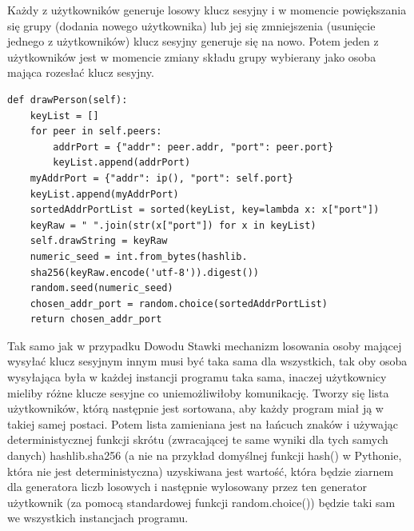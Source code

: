 Każdy z użytkowników generuje losowy klucz sesyjny i w momencie powiększania się grupy (dodania nowego użytkownika) lub jej się zmniejszenia (usunięcie jednego z użytkowników) klucz sesyjny generuje się na nowo. Potem jeden z użytkowników jest w momencie zmiany składu grupy wybierany jako osoba mająca rozesłać klucz sesyjny.


\begin{lstlisting}[caption={Wybieranie osoby mającej rozesłać klucz sesyjny}]
def drawPerson(self):
    keyList = []
    for peer in self.peers:
        addrPort = {"addr": peer.addr, "port": peer.port}
        keyList.append(addrPort)
    myAddrPort = {"addr": ip(), "port": self.port}
    keyList.append(myAddrPort)
    sortedAddrPortList = sorted(keyList, key=lambda x: x["port"])
    keyRaw = " ".join(str(x["port"]) for x in keyList)
    self.drawString = keyRaw
    numeric_seed = int.from_bytes(hashlib.
    sha256(keyRaw.encode('utf-8')).digest())
    random.seed(numeric_seed)
    chosen_addr_port = random.choice(sortedAddrPortList)
    return chosen_addr_port
\end{lstlisting}

Tak samo jak w przypadku Dowodu Stawki mechanizm losowania osoby mającej wysyłać klucz sesyjnym innym musi być taka sama dla wszystkich, tak oby osoba wysyłająca była w każdej instancji programu taka sama, inaczej użytkownicy mieliby różne klucze sesyjne co uniemożliwiłoby komunikację. Tworzy się lista użytkowników, którą następnie jest sortowana, aby każdy program miał ją w takiej samej postaci. Potem lista zamieniana jest na łańcuch znaków i używając deterministycznej funkcji skrótu (zwracającej te same wyniki dla tych samych danych) hashlib.sha256 (a nie na przykład domyślnej funkcji hash() w Pythonie, która nie jest deterministyczna) uzyskiwana jest wartość, która będzie ziarnem dla generatora liczb losowych i następnie wylosowany przez ten generator użytkownik (za pomocą standardowej funkcji random.choice()) będzie taki sam we wszystkich instancjach programu.

